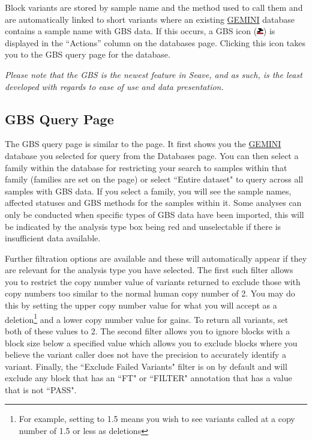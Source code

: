 \documentclass[11pt, a4paper]{article}
\newcommand{\GEMINI}{\href{https://gemini.readthedocs.io}{GEMINI} } %
\begin{document}
Block variants are stored by sample name and the method used to call them and are automatically linked to short variants where an existing \GEMINI database contains a sample name with GBS data. If this occurs, a GBS icon (\includegraphics[width=8pt]{GBS-Icon.png}) is displayed in the ``Actions'' column on the databases page. Clicking this icon takes you to the GBS query page for the database.

\textit{Please note that the GBS is the newest feature in Seave, and as such, is the least developed with regards to ease of use and data presentation.}

\subsection{GBS Query Page}

The GBS query page is similar to the  page. It first shows you the \GEMINI database you selected for query from the Databases page. You can then select a family within the database for restricting your search to samples within that family (families are set on the  page) or select ``Entire dataset" to query across all samples with GBS data. If you select a family, you will see the sample names, affected statuses and GBS methods for the samples within it. Some analyses can only be conducted when specific types of GBS data have been imported, this will be indicated by the analysis type box being red and unselectable if there is insufficient data available.

Further filtration options are available and these will automatically appear if they are relevant for the analysis type you have selected. The first such filter allows you to restrict the copy number value of variants returned to exclude those with copy numbers too similar to the normal human copy number of 2. You may do this by setting the upper copy number value for what you will accept as a deletion\footnote{For example, setting to 1.5 means you wish to see variants called at a copy number of 1.5 or less as deletions} and a lower copy number value for gains. To return all variants, set both of these values to 2. The second filter allows you to ignore blocks with a block size below a specified value which allows you to exclude blocks where you believe the variant caller does not have the precision to accurately identify a variant. Finally, the ``Exclude Failed Variants" filter is on by default and will exclude any block that has an ``FT" or ``FILTER" annotation that has a value that is not ``PASS".
\end{document}

